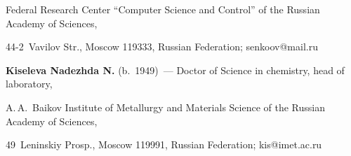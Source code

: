 
Federal Research Center ``Computer Science and Control'' of the  Russian Academy of Sciences,  

44-2~Vavilov Str., Moscow 119333, Russian Federation; \mbox{senkoov@mail.ru}  





\vspace*{3pt}



\noindent

\textbf{Kiseleva Nadezhda N.} (b.\ 1949)~--- Doctor of Science in chemistry, head of laboratory,  

A.\,A.~Baikov Institute of Metallurgy and Materials Science of the Russian Academy of Sciences, 

49~Leninskiy Prosp., Moscow 119991, Russian Federation; \mbox{kis@imet.ac.ru}

\label{end\stat}





\renewcommand{\bibname}{\protect\rm Литература}

